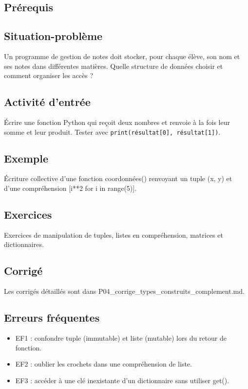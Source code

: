 \subsection{Prérequis}

\subsection{Situation-problème}

Un programme de gestion de notes doit stocker, pour chaque élève, son
nom et ses notes dans différentes matières. Quelle structure de données
choisir et comment organiser les accès ?

\subsection{Activité d’entrée}

Écrire une fonction Python qui reçoit deux nombres et renvoie à la fois
leur somme et leur produit. Tester avec \lstinline|print(résultat[0], résultat[1])|.

\subsection{Exemple}

Écriture collective d'une fonction coordonnées() renvoyant un tuple (x,
y) et d'une compréhension {[}i**2 for i in range(5){]}.

\subsection{Exercices}

Exercices de manipulation de tuples, listes en compréhension, matrices
et dictionnaires.

\subsection{Corrigé}

Les corrigés détaillés sont dans
P04\_corrige\_types\_construits\_complement.md.

\subsection{Erreurs fréquentes}

\begin{itemize}
\tightlist
\item
  EF1 : confondre tuple (immutable) et liste (mutable) lors du retour de
  fonction.
\item
  EF2 : oublier les crochets dans une compréhension de liste.
\item
  EF3 : accéder à une clé inexistante d'un dictionnaire sans utiliser
  get().
\end{itemize}

